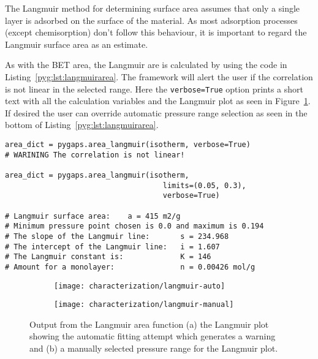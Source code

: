The Langmuir method for determining surface area assumes that only a single
layer is adsorbed on the surface of the material. As most adsorption processes
(except chemisorption) don't follow this behaviour, it is important to regard
the Langmuir surface area as an estimate.

As with the BET area, the Langmuir are is calculated by using the code in
Listing~\ref{pyg:lst:langmuirarea}. The framework will alert the user
if the correlation is not linear in the selected range.
Here the \lstinline{verbose=True} option prints a short
text with all the calculation variables and the Langmuir plot as seen in
Figure~\ref{pyg:fgr:langmuirarea-auto}. If desired the user can override 
automatic pressure range selection as seen in the bottom of
Listing~\ref{pyg:lst:langmuirarea}.

\begin{lstlisting}[caption={Calculating a Langmuir area},label={pyg:lst:langmuirarea}]
area_dict = pygaps.area_langmuir(isotherm, verbose=True)
# WARINING The correlation is not linear!

area_dict = pygaps.area_langmuir(isotherm, 
									limits=(0.05, 0.3), 
									verbose=True)

# Langmuir surface area: 	a = 415 m2/g
# Minimum pressure point chosen is 0.0 and maximum is 0.194
# The slope of the Langmuir line: 		s = 234.968
# The intercept of the Langmuir line: 	i = 1.607
# The Langmuir constant is:				K = 146
# Amount for a monolayer: 				n = 0.00426 mol/g
\end{lstlisting}

\begin{figure}[h!]
	\centering

    \begin{subfigure}{0.4\linewidth}
        \parbox[c]{0.1\linewidth}{\caption{}%
            \label{pyg:fgr:langmuirarea-auto}}
        \parbox[b]{0.7\linewidth}{%
            \texttt{[image: characterization/langmuir-auto]}}
    \end{subfigure}
    \begin{subfigure}{0.4\linewidth}
        \parbox[c]{0.1\linewidth}{\caption{}%
            \label{pyg:fgr:langmuirarea-manual}}
        \parbox[b]{0.7\linewidth}{%
            \texttt{[image: characterization/langmuir-manual]}}
    \end{subfigure}

	\caption{Output from the Langmuir area function (a) the Langmuir plot 
	showing the automatic fitting attempt which generates a warning and (b) a manually
	selected pressure range for the Langmuir plot.}%
    \label{pyg:fgr:langmuirarea}

\end{figure}

